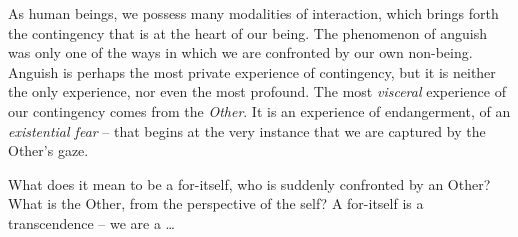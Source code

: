

As human beings, we possess many modalities of interaction, which brings forth the contingency that is at the heart of our being. The phenomenon of anguish was only one of the ways in which we are confronted by our own non-being. Anguish is perhaps the most private experience of contingency, but it is neither the only experience, nor even the most profound. The most \emph{visceral} experience of our contingency comes from the \emph{Other}. It is an experience of endangerment, of an \emph{existential fear} -- that begins at the very instance that we are captured by the Other's gaze. 

What does it mean to be a for-itself, who is suddenly confronted by an Other? What is the Other, from the perspective of the self? A for-itself is a transcendence -- we are a \ldots\